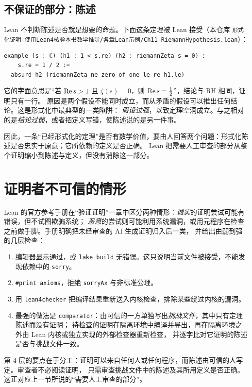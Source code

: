 \documentclass[11pt]{article}
\begin{document}
\subsection{不保证的部分：陈述}
Lean 不判断陈述是否就是想要的命题。下面这条定理被 Lean 接受（本仓库 \texttt{形式化证明-使用Lean4核验本书数学推导/\allowbreak 各章Lean示例/\allowbreak Ch11\_RiemannHypothesis.lean}）：
\begin{Verbatim}
example (s : ℂ) (h1 : 1 < s.re) (h2 : riemannZeta s = 0) :
    s.re = 1 / 2 :=
  absurd h2 (riemannZeta_ne_zero_of_one_le_re h1.le)
\end{Verbatim}
它的字面意思是“若 $\operatorname{Re} s>1$ 且 $\zeta(s)=0$，则 $\operatorname{Re} s=\tfrac12$”，结论与 RH 相同，证明只有一行。
原因是两个假设不能同时成立，而从矛盾的假设可以推出任何结论。这是形式化中最典型的一类陷阱：
\emph{假设过强}，以致定理空洞成立。与之相对的是\emph{结论过弱}，或者把定义写错，使陈述说的是另一件事。

因此，一条“已经形式化的定理”是否有数学价值，要由人回答两个问题：形式化陈述是否忠实于原意；它所依赖的定义是否正确。
Lean 把需要人工审查的部分从整个证明缩小到陈述与定义，但没有消除这一部分。

\section{证明者不可信的情形}
Lean 的官方参考手册在“验证证明”一章中区分两种情形：\emph{诚实}的证明尝试可能有错误，但不试图欺骗系统；
\emph{恶意}的尝试则可能利用系统漏洞，或用元程序在检查之前做手脚。手册明确把未经审查的 AI 生成证明归入后一类，
并给出由弱到强的几层检查：
\begin{enumerate}
 \item 编辑器显示通过，或 \texttt{lake build} 无错误。这只说明当前文件被接受，不能发现依赖中的 \texttt{sorry}。
 \item \texttt{\#print axioms}，拒绝 \texttt{sorryAx} 与非标准公理。
 \item 用 \texttt{lean4checker} 把编译结果重新送入内核检查，排除某些绕过内核的漏洞。
 \item 最强的做法是 \texttt{comparator}：由可信的一方单独写出\emph{挑战文件}，其中只有定理陈述而没有证明；
 待检查的证明在隔离环境中编译并导出，再在隔离环境之外由 Lean 内核或独立实现的外部检查器重新检查，
 并逐字比对它证明的陈述是否与挑战文件一致。
\end{enumerate}
第 4 层的要点在于分工：证明可以来自任何人或任何程序，而陈述由可信的人写定。审查者不必阅读证明，
只需审查挑战文件中的陈述及其所用定义是否正确。这正对应上一节所说的“需要人工审查的部分”。
\end{document}
